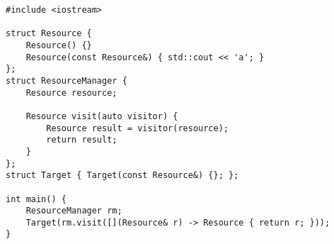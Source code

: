 \begin{lstlisting}[title=\href{https://godbolt.org/z/xSvThr}{\texttt{godbolt.org/z/xSvThr}}]
#include <iostream>

struct Resource {
    Resource() {}
    Resource(const Resource&) { std::cout << 'a'; }
};
struct ResourceManager {
    Resource resource;
 
    Resource visit(auto visitor) {
        Resource result = visitor(resource);
        return result;
    }
};
struct Target { Target(const Resource&) {}; };

int main() {
    ResourceManager rm;
    Target(rm.visit([](Resource& r) -> Resource { return r; }));
}
\end{lstlisting}
